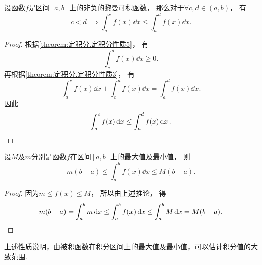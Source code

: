 \begin{corollary}\label{theorem:定积分.定积分性质5推论3}
设函数\(f\)是区间\([a,b]\)上的非负的黎曼可积函数，
那么对于\(\forall c,d\in(a,b)\)，
有\begin{equation*}
	c<d
	\implies
	\int_a^c f(x) \dd{x} \leq \int_a^d f(x) \dd{x}.
\end{equation*}
\begin{proof}
根据\cref{theorem:定积分.定积分性质5}，
有\begin{equation*}
	\int_c^d f(x) \dd{x} \geq 0.
\end{equation*}
再根据\cref{theorem:定积分.定积分性质3}，
有\begin{equation*}
	\int_a^c f(x) \dd{x}
	+ \int_c^d f(x) \dd{x}
	= \int_a^d f(x) \dd{x}.
\end{equation*}
因此\begin{equation*}
	\int_a^c f(x) \dd{x}
	\leq
	\int_a^d f(x) \dd{x}.
	\qedhere
\end{equation*}
\end{proof}
\end{corollary}

\begin{property}\label{theorem:定积分.定积分性质6}
设\(M\)及\(m\)分别是函数\(f\)在区间\([a,b]\)上的最大值及最小值，
则\begin{equation*}
	m(b-a) \leq \int_a^b f(x) \dd{x} \leq M(b-a).
\end{equation*}
\begin{proof}
因为\(m \leq f(x) \leq M\)，
所以由上述推论，
得\begin{equation*}
	m(b-a)
	= \int_a^b m \dd{x}
	\leq \int_a^b f(x) \dd{x}
	\leq \int_a^b M \dd{x}
	= M(b-a).
	\qedhere
\end{equation*}
\end{proof}
\end{property}
上述性质说明，由被积函数在积分区间上的最大值及最小值，可以估计积分值的大致范围.

